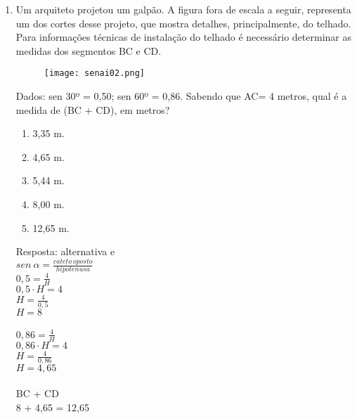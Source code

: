 \documentclass[a4paper,14pt]{article}
\begin{document}
\begin{enumerate}
    	\item Um arquiteto projetou um galpão. A figura fora de escala a seguir, representa um dos cortes desse
    	projeto, que mostra detalhes, principalmente, do telhado. Para informações técnicas de instalação do
    	telhado é necessário determinar as medidas dos segmentos BC e CD. \\
    	\begin{figure}[h] %
    		\centering
    		\texttt{[image: senai02.png]} %
    	\end{figure}
    	\newline
    	Dados: sen 30º = 0,50; sen 60º = 0,86.
    	\newline
    	\newline
    	Sabendo que AC= 4 metros, qual é a medida de (BC + CD), em metros? \\
    	\begin{enumerate}
    		\item 3,35 m.
    		\item 4,65 m.
    		\item 5,44 m.
    		\item 8,00 m.
    		\item 12,65 m.
    	\end{enumerate}
        Resposta: alternativa e
        \newline
        \\
        $sen~\alpha = \frac{cateto~oposto}{hipotenusa}$ \\
        $0,5 = \frac{4}{H}$ \\
        $0,5 \cdot H = 4$ \\
        $H = \frac{4}{0,5}$ \\ 
        $H = 8$ \\
        \\
        $0,86 = \frac{4}{H}$ \\
        $0,86 \cdot H = 4$ \\
        $H = \frac{4}{0,86}$ \\
        $H = 4,65$ \\
        \\
        BC + CD \\
        8 + 4,65 = 12,65 \\
        
    	\vspace{0cm}
    	

\end{enumerate}
\end{document}
